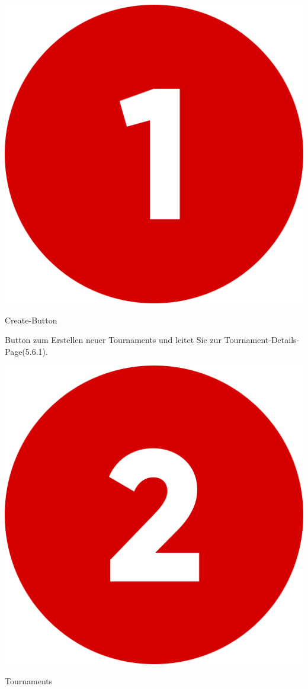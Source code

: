 \includegraphics[scale=0.05]{pics/user-guide/numbers/number-1.png} \begin{LARGE} Create-Button \end{LARGE}

Button zum Erstellen neuer Tournaments und leitet Sie zur Tournament-Details-Page(5.6.1).

\bigskip
\includegraphics[scale=0.05]{pics/user-guide/numbers/number-2.png} \begin{LARGE} Tournaments \end{LARGE}

